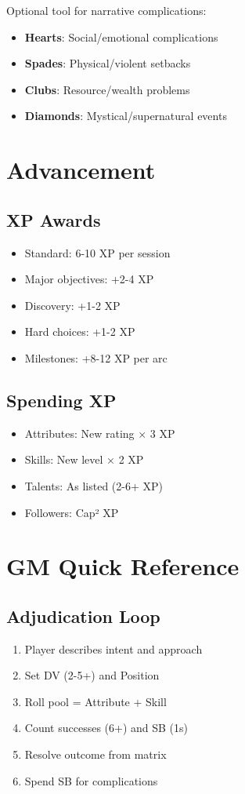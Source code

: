 \documentclass[11pt]{article}
\begin{document}
Optional tool for narrative complications:
\begin{itemize}
    \item \textbf{Hearts}: Social/emotional complications
    \item \textbf{Spades}: Physical/violent setbacks  
    \item \textbf{Clubs}: Resource/wealth problems
    \item \textbf{Diamonds}: Mystical/supernatural events
\end{itemize}

\section{Advancement}

\subsection{XP Awards}
\begin{itemize}
    \item Standard: 6-10 XP per session
    \item Major objectives: +2-4 XP
    \item Discovery: +1-2 XP
    \item Hard choices: +1-2 XP
    \item Milestones: +8-12 XP per arc
\end{itemize}

\subsection{Spending XP}
\begin{itemize}
    \item Attributes: New rating × 3 XP
    \item Skills: New level × 2 XP
    \item Talents: As listed (2-6+ XP)
    \item Followers: Cap² XP
\end{itemize}

\section{GM Quick Reference}

\subsection{Adjudication Loop}
\begin{enumerate}
    \item Player describes intent and approach
    \item Set DV (2-5+) and Position
    \item Roll pool = Attribute + Skill
    \item Count successes (6+) and SB (1s)
    \item Resolve outcome from matrix
    \item Spend SB for complications
\end{enumerate}
\end{document}
